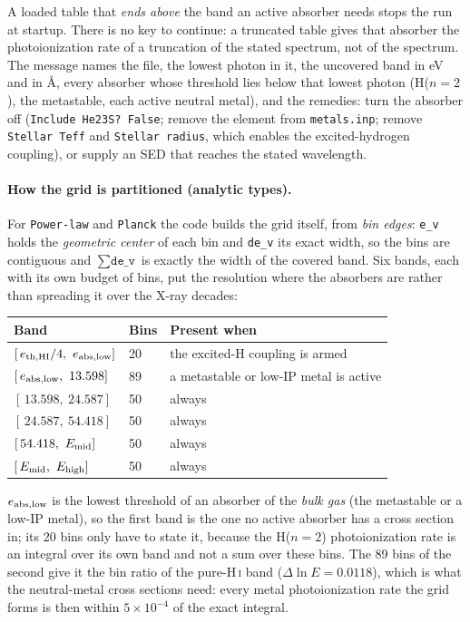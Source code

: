 \documentclass[english,a4paper]{my_memo}
\begin{document}
A loaded table that \emph{ends above} the band an active absorber needs stops
the run at startup. There is no key to continue: a truncated table gives that
absorber the photoionization rate of a truncation of the stated spectrum, not
of the spectrum. The message names the file, the lowest photon in it, the
uncovered band in eV and in \AA, every absorber whose threshold lies below
that lowest photon (H($n{=}2$), the metastable, each active neutral metal),
and the remedies: turn the absorber off (\texttt{Include He23S? False}; remove
the element from \texttt{metals.inp}; remove \texttt{Stellar Teff} and
\texttt{Stellar radius}, which enables the excited-hydrogen coupling), or
supply an SED that reaches the stated wavelength.

\paragraph{How the grid is partitioned (analytic types).} For
\texttt{Power-law} and \texttt{Planck} the code builds the grid itself, from
\emph{bin edges}: \texttt{e\_v} holds the \emph{geometric center} of each bin
and \texttt{de\_v} its exact width, so the bins are contiguous and
$\sum \texttt{de\_v}$ is exactly the width of the covered band. Six bands, each
with its own budget of bins, put the resolution where the absorbers are rather
than spreading it over the X-ray decades:
\begin{center}\small
\begin{tabular}{@{}lll@{}}
\toprule
Band & Bins & Present when \\
\midrule
$[\,e_{\rm th,HI}/4,\ e_{\rm abs,low}]$ & 20 & the excited-H coupling is armed \\
$[\,e_{\rm abs,low},\ 13.598]$          & 89 & a metastable or low-IP metal is active \\
$[\,13.598,\ 24.587]$                   & 50 & always \\
$[\,24.587,\ 54.418]$                   & 50 & always \\
$[\,54.418,\ E_{\rm mid}]$              & 50 & always \\
$[\,E_{\rm mid},\ E_{\rm high}]$        & 50 & always \\
\bottomrule
\end{tabular}
\end{center}
$e_{\rm abs,low}$ is the lowest threshold of an absorber of the \emph{bulk
gas} (the metastable or a low-IP metal), so the first band is the one no
active absorber has a cross section in; its 20 bins only have to state it,
because the H($n{=}2$) photoionization rate is an integral over its own band
and not a sum over these bins. The 89 bins of the second give it the bin ratio
of the pure-H\,\textsc{i} band ($\Delta\ln E = 0.0118$), which is what the
neutral-metal cross sections need: every metal photoionization rate the grid
forms is then within $5\times10^{-4}$ of the exact integral.
\end{document}
